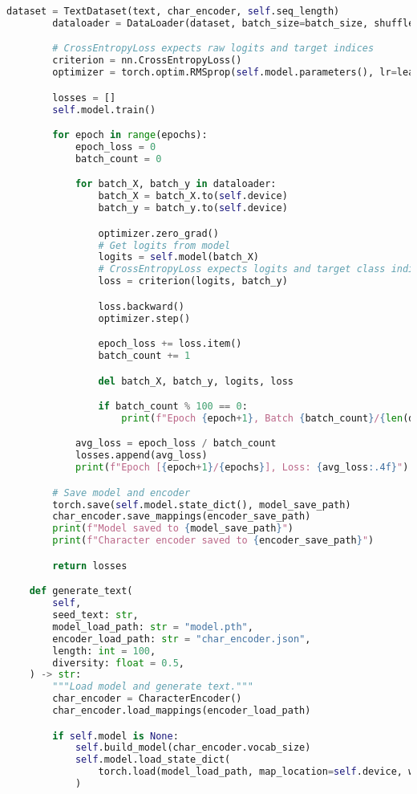 \documentclass[12pt]{article}
\begin{document}
\begin{lstlisting}[language=Python]
        dataset = TextDataset(text, char_encoder, self.seq_length)
        dataloader = DataLoader(dataset, batch_size=batch_size, shuffle=True)

        # CrossEntropyLoss expects raw logits and target indices
        criterion = nn.CrossEntropyLoss()
        optimizer = torch.optim.RMSprop(self.model.parameters(), lr=learning_rate)

        losses = []
        self.model.train()

        for epoch in range(epochs):
            epoch_loss = 0
            batch_count = 0

            for batch_X, batch_y in dataloader:
                batch_X = batch_X.to(self.device)
                batch_y = batch_y.to(self.device)

                optimizer.zero_grad()
                # Get logits from model
                logits = self.model(batch_X)
                # CrossEntropyLoss expects logits and target class indices
                loss = criterion(logits, batch_y)

                loss.backward()
                optimizer.step()

                epoch_loss += loss.item()
                batch_count += 1

                del batch_X, batch_y, logits, loss

                if batch_count % 100 == 0:
                    print(f"Epoch {epoch+1}, Batch {batch_count}/{len(dataloader)}")

            avg_loss = epoch_loss / batch_count
            losses.append(avg_loss)
            print(f"Epoch [{epoch+1}/{epochs}], Loss: {avg_loss:.4f}")

        # Save model and encoder
        torch.save(self.model.state_dict(), model_save_path)
        char_encoder.save_mappings(encoder_save_path)
        print(f"Model saved to {model_save_path}")
        print(f"Character encoder saved to {encoder_save_path}")

        return losses

    def generate_text(
        self,
        seed_text: str,
        model_load_path: str = "model.pth",
        encoder_load_path: str = "char_encoder.json",
        length: int = 100,
        diversity: float = 0.5,
    ) -> str:
        """Load model and generate text."""
        char_encoder = CharacterEncoder()
        char_encoder.load_mappings(encoder_load_path)

        if self.model is None:
            self.build_model(char_encoder.vocab_size)
            self.model.load_state_dict(
                torch.load(model_load_path, map_location=self.device, weights_only=True)
            )


\end{lstlisting}
\end{document}
